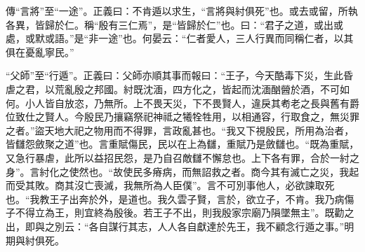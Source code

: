 {\noindent\zhuan{}\fzbyks 傳“言將”至“一途”。正義曰：不肯遁以求生，“言將與紂俱死”也。或去或留，所執各異，皆歸於仁。稱“殷有三仁焉”，是“皆歸於仁”也。曰：“君子之道，或出或處，或默或語。”是“非一途”也。何晏云：“仁者愛人，三人行異而同稱仁者，以其俱在憂亂寧民。” \par}

{\noindent\shu{}\fzkt “父師”至“行遁”。正義曰：父師亦順其事而報曰：“王子，今天酷毒下災，生此昏虐之君，以荒亂殷之邦國。紂既沈湎，四方化之，皆起而沈湎酗醟於酒，不可如何。小人皆自放恣，乃無所。上不畏天災，下不畏賢人，違戾其耇老之長與舊有爵位致仕之賢人。今殷民乃攘竊祭祀神祗之犧牷牲用，以相通容，行取食之，無災罪之者。”盜天地大祀之物用而不得罪，言政亂甚也。“我又下視殷民，所用為治者，皆讎怨斂聚之道”也。言重賦傷民，民以在上為讎，重賦乃是斂讎也。“既為重賦，又急行暴虐，此所以益招民怨，是乃自召敵讎不懈怠也。上下各有罪，合於一紂之身”。言紂化之使然也。“故使民多瘠病，而無詔救之者。商今其有滅亡之災，我起而受其敗。商其沒亡喪滅，我無所為人臣僕”。言不可別事他人，必欲諫取死也。“我教王子出奔於外，是道也。我久雲子賢，言於，欲立子，不肯。我乃病傷子不得立為王，則宜終為殷後。若王子不出，則我殷家宗廟乃隕墜無主”。既勸之出，即與之別云：“各自謀行其志，人人各自獻達於先王，我不顧念行遁之事。”明期與紂俱死。 \par}

